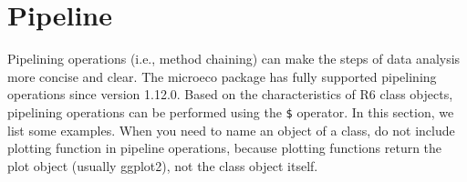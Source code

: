 \documentclass[
]{book}
\newenvironment{Shaded}{\begin{snugshade}}{\end{snugshade}}
\newcommand{\AttributeTok}[1]{\textcolor[rgb]{0.13,0.29,0.53}{#1}}
\newcommand{\CommentTok}[1]{\textcolor[rgb]{0.56,0.35,0.01}{\textit{#1}}}
\newcommand{\ConstantTok}[1]{\textcolor[rgb]{0.56,0.35,0.01}{#1}}
\newcommand{\DecValTok}[1]{\textcolor[rgb]{0.00,0.00,0.81}{#1}}
\newcommand{\FunctionTok}[1]{\textcolor[rgb]{0.13,0.29,0.53}{\textbf{#1}}}
\newcommand{\NormalTok}[1]{#1}
\newcommand{\OtherTok}[1]{\textcolor[rgb]{0.56,0.35,0.01}{#1}}
\newcommand{\SpecialCharTok}[1]{\textcolor[rgb]{0.81,0.36,0.00}{\textbf{#1}}}
\begin{document}
\begin{Shaded}
\end{Shaded}

\chapter{Pipeline}\label{pipeline}

Pipelining operations (i.e., method chaining) can make the steps of data analysis more concise and clear.
The microeco package has fully supported pipelining operations since version 1.12.0.
Based on the characteristics of R6 class objects, pipelining operations can be performed using the \texttt{\$} operator.
In this section, we list some examples.
When you need to name an object of a class,
do not include plotting function in pipeline operations, because plotting functions return the plot object (usually ggplot2), not the class object itself.
\end{document}
